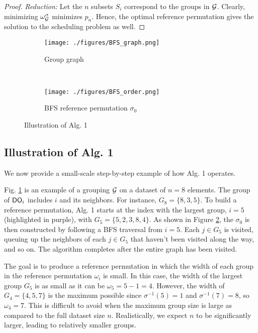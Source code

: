 \begin{proof}
\textit{Reduction:}
Let the $n$ subsets $S_i$ correspond to the groups in $\mathcal{G}$. Clearly, minimizing $\omega^{\sigma}_{\mathcal{G}}$ minimizes $p_n$. Hence, the optimal reference permutation gives the solution to the scheduling problem as well. 

 \end{proof}
 
 
 \begin{figure}[h]
\begin{subfigure}[b]{\columnwidth}\centering
    \texttt{[image: ./figures/BFS\_graph.png]}
        \caption{Group graph}
        \label{fig:BFS:graph}
    \end{subfigure}\\
    \begin{subfigure}[b]{\columnwidth}\centering
    \texttt{[image: ./figures/BFS\_order.png]}
        \caption{BFS reference permutation $\sigma_0$}
        \label{fig:BFS:order}
    \end{subfigure}
    \caption{Illustration of Alg. 1}
    \label{fig:alg:example}
\end{figure}
 
 
 \subsection{Illustration of Alg. 1}\label{app:alg:illustration}
 We now provide a small-scale step-by-step example of how Alg. 1 operates. 
 
 Fig. \ref{fig:BFS:graph} is an example of a grouping $\mathcal{G}$ on a dataset of $n = 8$ elements. The group of $\textsf{DO}_i$ includes $i$ and its neighbors. For instance, $G_8 = \{8,3,5\}$. To build a reference permutation, Alg. 1 starts at the index with the largest group, $i = 5$ (highlighted in purple), with $G_5 = \{5,2,3,8,4\}$. As shown in Figure \ref{fig:BFS:order}, the $\sigma_0$ is then constructed by following a BFS traversal from $i=5$. Each $j \in G_5$ is visited, queuing up the neighbors of each $j \in G_5$ that haven't been visited along the way, and so on. The algorithm completes after the entire graph has been visited. 
 
 The goal is to produce a reference permutation in which the width of each group in the reference permutation $\omega_i$ is small. In this case, the width of the largest group $G_5$ is as small as it can be $\omega_5 =5-1 = 4$. However, the width of $G_4 = \{4,5,7\}$ is the maximum possible since $\sigma^{-1}(5) = 1$ and $\sigma^{-1}(7) = 8$, so $\omega_4 = 7$. This is difficult to avoid when the maximum group size is large as compared to the full dataset size $n$. Realistically, we expect $n$ to be significantly larger, leading to relatively smaller groups. 
 
